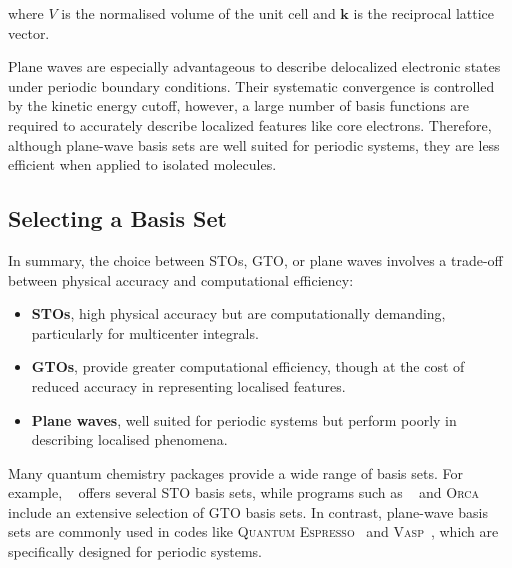 \noindent where $V$ is the normalised volume of the unit cell and $\mathbf{k}$
is the reciprocal lattice vector.

Plane waves are especially advantageous to describe delocalized electronic
states under periodic boundary conditions. Their systematic convergence is
controlled by the kinetic energy cutoff, however, a large number of basis
functions are required to accurately describe localized features like core
electrons.  Therefore, although plane-wave basis sets are well suited for
periodic systems, they are less efficient when applied to isolated molecules.

\subsection{Selecting a Basis Set}

In summary, the choice between \glspl{STO}, \gls{GTO}, or plane waves involves
a trade-off between physical accuracy and computational efficiency:

\begin{itemize}
  \item \textbf{STOs}, high physical accuracy but are computationally
    demanding, particularly for multicenter integrals.
  \item \textbf{GTOs}, provide greater computational efficiency, though at the
    cost of reduced accuracy in representing localised features.
  \item \textbf{Plane waves}, well suited for periodic systems but perform
    poorly in describing localised phenomena.
\end{itemize}

\newpage
Many quantum chemistry packages provide a wide range of basis sets. For
example, \ams~\cite{ams2025} offers several \gls{STO} basis sets, while
programs such as \gseize~\cite{g16} and \textsc{Orca}~\cite{ORCA} include an
extensive selection of \gls{GTO} basis sets. In contrast, plane-wave basis sets
are commonly used in codes like \textsc{Quantum
Espresso}~\cite{quantum_espresso} and \textsc{Vasp}~\cite{Kresse1996CMS}, which
are specifically designed for periodic systems.


